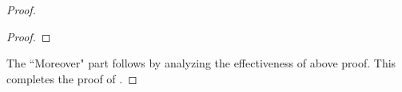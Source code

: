\documentclass[10pt,a4paper]{amsart}
\def\h{\hat}
\def\mcal{\mathcal}
\def\sufficient{matching}
\def\uhr{\upharpoonright}
\def\vwsamelong{\mathsf{OSub}^=}
\def\wsamelong{\mathsf{WSub}^{=}}
\def\wshorter{\mathsf{WSub}^{*}}
\begin{document}
\begin{proof}
\begin{proof}




\end{proof}
The ``Moreover" part follows by analyzing  the effectiveness of above proof.
This completes the proof of .
\end{proof}
\end{document}

